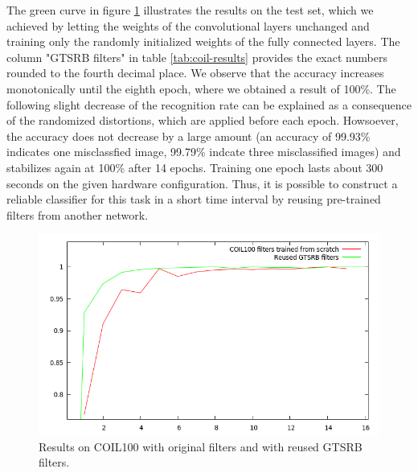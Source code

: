 \documentclass[11pt, a4paper]{article}
\begin{document}
The green curve in figure \ref{fig:coil100_results} illustrates the results on the test set, which we achieved by letting the weights of the convolutional layers unchanged and training only the randomly initialized weights of the fully connected layers. The column "GTSRB filters" in table \ref{tab:coil-results} provides the exact numbers rounded to the fourth decimal place. We observe that the accuracy increases monotonically until the eighth epoch, where we obtained a result of 100\%. The following slight decrease of the recognition rate can be explained as a consequence of the randomized distortions, which are applied before each epoch. Howsoever, the accuracy does not decrease by a large amount (an accuracy of 99.93\% indicates one misclassfied image, 99.79\% indcate three misclassified images) and stabilizes again at 100\% after 14 epochs. Training one epoch lasts about 300 seconds on the given hardware configuration. Thus, it is possible to construct a reliable classifier for this task in a short time interval by reusing pre-trained filters from another network.%
\begin{figure}[h!]
	\centering
	\includegraphics[width=1\textwidth]{coil100_results.png}
	\caption{Results on COIL100 with original filters and with reused GTSRB filters.}
	\label{fig:coil100_results}
\end{figure}
\end{document}
